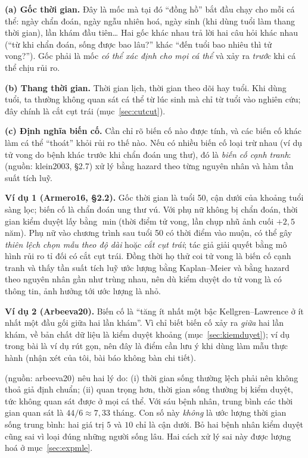 \documentclass[11pt,a4paper,notitlepage]{report}
\providecommand{\nguon}[1]{(nguồn: #1)}
\begin{document}
\begin{bosung}
\textbf{(a) Gốc thời gian.} Đây là mốc mà tại đó ``đồng hồ'' bắt đầu chạy cho mỗi cá thể: ngày chẩn đoán, ngày ngẫu nhiên hoá,
ngày sinh (khi dùng tuổi làm thang thời gian), lần khám đầu tiên\ldots{} Hai gốc khác nhau trả lời hai câu hỏi khác nhau
(``từ khi chẩn đoán, sống được bao lâu?'' khác ``đến tuổi bao nhiêu thì tử vong?'').
Gốc phải là mốc \emph{có thể xác định cho mọi cá thể} và xảy ra \emph{trước} khi cá thể chịu rủi ro.

\textbf{(b) Thang thời gian.} Thời gian lịch, thời gian theo dõi hay tuổi. Khi dùng tuổi, ta thường không quan sát cá thể từ lúc sinh mà chỉ từ tuổi
vào nghiên cứu; đây chính là cắt cụt trái (mục~\ref{sec:cutcut}).

\textbf{(c) Định nghĩa biến cố.} Cần chỉ rõ biến cố nào được tính, và các biến cố khác làm cá thể ``thoát'' khỏi rủi ro thế nào.
Nếu có nhiều biến cố loại trừ nhau (ví dụ tử vong do bệnh khác trước khi chẩn đoán ung thư), đó là \emph{biến cố cạnh tranh}:
\nguon{klein2003, \S2.7} xử lý bằng hazard theo từng nguyên nhân và hàm tần suất tích luỹ.

\medskip
\textbf{Ví dụ 1 (Armero16, \S2.2).} Gốc thời gian là tuổi 50, cận dưới của khoảng tuổi sàng lọc; biến cố là chẩn đoán ung thư vú.
Với phụ nữ không bị chẩn đoán, thời gian kiểm duyệt lấy bằng $\min$(thời điểm tử vong, lần chụp nhũ ảnh cuối $+2{,}5$ năm).
Phụ nữ vào chương trình sau tuổi 50 có thời điểm vào muộn, có thể gây \emph{thiên lệch chọn mẫu theo độ dài} hoặc \emph{cắt cụt trái};
tác giả giải quyết bằng mô hình rủi ro tỉ đối có cắt cụt trái. Đồng thời họ thử coi tử vong là biến cố cạnh tranh và thấy
tần suất tích luỹ ước lượng bằng Kaplan--Meier và bằng hazard theo nguyên nhân gần như trùng nhau, nên dù kiểm duyệt do tử vong
là có thông tin, ảnh hưởng tới ước lượng là nhỏ.

\textbf{Ví dụ 2 (Arbeeva20).} Biến cố là ``tăng ít nhất một bậc Kellgren--Lawrence ở ít nhất một đầu gối giữa hai lần khám''.
Vì chỉ biết biến cố xảy ra \emph{giữa} hai lần khám, về bản chất dữ liệu là kiểm duyệt khoảng (mục~\ref{sec:kiemduyet});
ví dụ trong bài là ví dụ rút gọn, nên đây là điểm cần lưu ý khi dùng làm mẫu thực hành (nhận xét của tôi, bài báo không bàn chi tiết).
\end{bosung}

\begin{bosung}
\nguon{arbeeva20} nêu hai lý do: (i) thời gian sống thường lệch phải nên không thoả giả định chuẩn; (ii) quan trọng hơn,
thời gian sống thường bị kiểm duyệt, tức không quan sát được ở mọi cá thể.
Với sáu bệnh nhân, trung bình các thời gian quan sát là $44/6\approx 7{,}33$ tháng. Con số này \emph{không} là ước lượng thời gian sống trung bình:
hai giá trị $5$ và $10$ chỉ là cận dưới. Bỏ hai bệnh nhân kiểm duyệt cũng sai vì loại đúng những người sống lâu. Hai cách xử lý sai này được lượng hoá ở mục~\ref{sec:expmle}.
\end{bosung}
\end{document}
